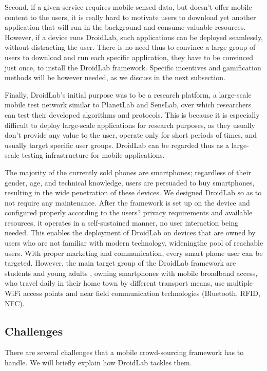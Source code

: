 \documentclass[conference,letterpaper]{IEEEtran}
\begin{document}
Second, if a given service requires mobile sensed data, but doesn't offer mobile content to the users, it is really hard to motivate users to download yet another application that will run in the background and consume valuable resources. However, if a device runs DroidLab, such applications can be deployed seamlessly, without distracting the user. There is no need thus to convince a large group of users to download and run each specific application, they have to be convinced just once, to install the DroidLab framework. Specific incentives and gamification methods will be however needed, as we discuss in the next subsection. 

Finally, DroidLab's initial purpose was to be a research platform, a large-scale mobile test network similar to PlanetLab and SensLab, over which researchers can test their developed algorithms and protocols. This is because it is especially difficult to deploy large-scale applications for research purposes, as they usually don't provide any value to the user, operate only for short periods of times, and usually target specific user groups. DroidLab can be regarded thus as a large-scale testing infrastructure for mobile applications. 

The majority of the currently sold phones are smartphones; regardless of their gender, age, and technical knowledge, users are persuaded to buy smartphones, resulting in the wide penetration of these devices. We designed DroidLab so as to not require any maintenance. After the framework is set up on the device and configured properly according to the users? privacy requirements and available resources, it operates in a self-sustained manner, no user interaction being needed. This enables the deployment of DroidLab on devices that are owned by users who are not familiar with modern technology, wideningthe pool of reachable users. With proper marketing and communication, every smart phone user can be targeted. However, the main target group of the DroidLab framework are students and young adults , owning smartphones with mobile broadband access, who travel daily in their home town by different transport means, use multiple WiFi access points and near field communication technologies (Bluetooth, RFID, NFC).

\subsection{Challenges}

There are several challenges that a mobile crowd-sourcing framework has to handle. We will briefly explain how DroidLab tackles them.
 
\end{document}
